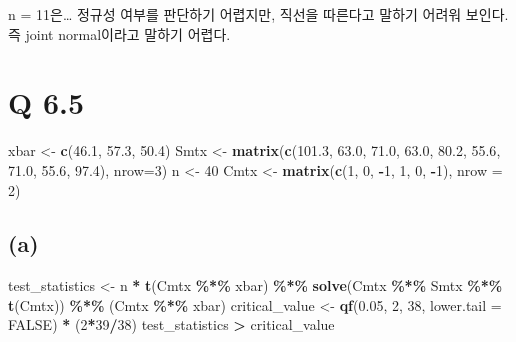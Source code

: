 \documentclass[
]{article}
\newenvironment{Shaded}{\begin{snugshade}}{\end{snugshade}}
\newcommand{\AttributeTok}[1]{\textcolor[rgb]{0.13,0.29,0.53}{#1}}
\newcommand{\ConstantTok}[1]{\textcolor[rgb]{0.56,0.35,0.01}{#1}}
\newcommand{\DecValTok}[1]{\textcolor[rgb]{0.00,0.00,0.81}{#1}}
\newcommand{\FloatTok}[1]{\textcolor[rgb]{0.00,0.00,0.81}{#1}}
\newcommand{\FunctionTok}[1]{\textcolor[rgb]{0.13,0.29,0.53}{\textbf{#1}}}
\newcommand{\NormalTok}[1]{#1}
\newcommand{\OtherTok}[1]{\textcolor[rgb]{0.56,0.35,0.01}{#1}}
\newcommand{\SpecialCharTok}[1]{\textcolor[rgb]{0.81,0.36,0.00}{\textbf{#1}}}
\begin{document}
n = 11은\ldots{} 정규성 여부를 판단하기 어렵지만, 직선을 따른다고 말하기
어려워 보인다. 즉 joint normal이라고 말하기 어렵다.

\section{Q 6.5}\label{q-6.5}

\begin{Shaded}
\begin{Highlighting}[]
\NormalTok{xbar }\OtherTok{\textless{}{-}} \FunctionTok{c}\NormalTok{(}\FloatTok{46.1}\NormalTok{, }\FloatTok{57.3}\NormalTok{, }\FloatTok{50.4}\NormalTok{)}
\NormalTok{Smtx }\OtherTok{\textless{}{-}} \FunctionTok{matrix}\NormalTok{(}\FunctionTok{c}\NormalTok{(}\FloatTok{101.3}\NormalTok{, }\FloatTok{63.0}\NormalTok{, }\FloatTok{71.0}\NormalTok{, }\FloatTok{63.0}\NormalTok{, }\FloatTok{80.2}\NormalTok{, }\FloatTok{55.6}\NormalTok{, }\FloatTok{71.0}\NormalTok{, }\FloatTok{55.6}\NormalTok{, }\FloatTok{97.4}\NormalTok{), }\AttributeTok{nrow=}\DecValTok{3}\NormalTok{)}
\NormalTok{n }\OtherTok{\textless{}{-}} \DecValTok{40}
\NormalTok{Cmtx }\OtherTok{\textless{}{-}} \FunctionTok{matrix}\NormalTok{(}\FunctionTok{c}\NormalTok{(}\DecValTok{1}\NormalTok{, }\DecValTok{0}\NormalTok{, }\SpecialCharTok{{-}}\DecValTok{1}\NormalTok{, }\DecValTok{1}\NormalTok{, }\DecValTok{0}\NormalTok{, }\SpecialCharTok{{-}}\DecValTok{1}\NormalTok{), }\AttributeTok{nrow =} \DecValTok{2}\NormalTok{)}
\end{Highlighting}
\end{Shaded}

\subsection{(a)}\label{a-1}

\begin{Shaded}
\begin{Highlighting}[]
\NormalTok{test\_statistics }\OtherTok{\textless{}{-}}\NormalTok{ n }\SpecialCharTok{*} \FunctionTok{t}\NormalTok{(Cmtx }\SpecialCharTok{\%*\%}\NormalTok{ xbar) }\SpecialCharTok{\%*\%} \FunctionTok{solve}\NormalTok{(Cmtx }\SpecialCharTok{\%*\%}\NormalTok{ Smtx }\SpecialCharTok{\%*\%} \FunctionTok{t}\NormalTok{(Cmtx)) }\SpecialCharTok{\%*\%}\NormalTok{ (Cmtx }\SpecialCharTok{\%*\%}\NormalTok{ xbar)}
\NormalTok{critical\_value }\OtherTok{\textless{}{-}} \FunctionTok{qf}\NormalTok{(}\FloatTok{0.05}\NormalTok{, }\DecValTok{2}\NormalTok{, }\DecValTok{38}\NormalTok{, }\AttributeTok{lower.tail =} \ConstantTok{FALSE}\NormalTok{) }\SpecialCharTok{*}\NormalTok{ (}\DecValTok{2}\SpecialCharTok{*}\DecValTok{39}\SpecialCharTok{/}\DecValTok{38}\NormalTok{)}
\NormalTok{test\_statistics }\SpecialCharTok{\textgreater{}}\NormalTok{ critical\_value}
\end{Highlighting}
\end{Shaded}
\end{document}
